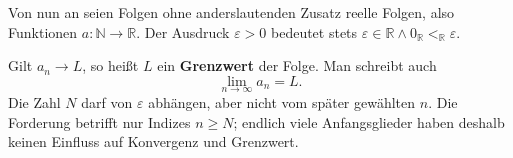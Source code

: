 \documentclass[main.tex]{subfiles}
\providecommand{\RealLt}{\mathrel{<_{\mathbb R}}}
\providecommand{\RealZero}{0_{\mathbb R}}
\begin{document}
Von nun an seien Folgen ohne anderslautenden Zusatz reelle Folgen, also
Funktionen \(a\colon\mathbb N\to\mathbb R\). Der Ausdruck
\(\varepsilon>0\) bedeutet stets
\(\varepsilon\in\mathbb R\land\RealZero\RealLt\varepsilon\).


Gilt \(a_n\to L\), so heißt \(L\) ein \textbf{Grenzwert} der Folge. Man
schreibt auch
\[
  \lim_{n\to\infty}a_n=L.
\]
Die Zahl \(N\) darf von \(\varepsilon\) abhängen, aber nicht vom später
gewählten \(n\). Die Forderung betrifft nur Indizes \(n\geq N\); endlich
viele Anfangsglieder haben deshalb keinen Einfluss auf Konvergenz und
Grenzwert.

\end{document}
